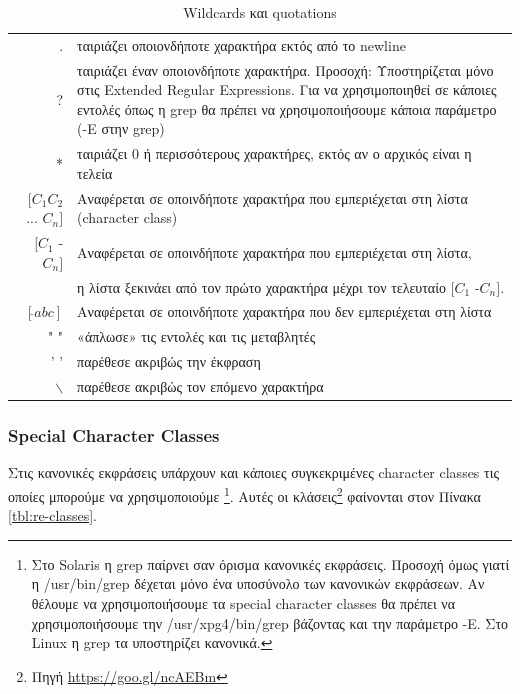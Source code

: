 \begin{table}[h]
	\begin{tabularx}{\columnwidth}{r|X}
		.   & ταιριάζει οποιονδήποτε χαρακτήρα εκτός από το newline \\
		? 	& ταιριάζει έναν οποιονδήποτε χαρακτήρα. Προσοχή: Υποστηρίζεται μόνο στις Extended Regular Expressions. Για να χρησιμοποιηθεί σε κάποιες εντολές όπως η grep θα πρέπει να χρησιμοποιήσουμε κάποια παράμετρο (-E στην grep)\\
		* 	& ταιριάζει 0 ή περισσότερους χαρακτήρες, εκτός αν ο αρχικός είναι η τελεία\\
		$[C_{1}C_{2}$ ... $C_{n}]$ 	& Αναφέρεται σε οποινδήποτε χαρακτήρα που εμπεριέχεται στη λίστα (character class) \\			
		$[C_{1}$ - $C_{n}]$ 		& Αναφέρεται σε οποινδήποτε χαρακτήρα που εμπεριέχεται στη λίστα, \\
		& η λίστα ξεκινάει από τον πρώτο χαρακτήρα μέχρι τον τελευταίο $[C_{1}$ -$C_{n}]$.\\
		$[  \hat{ }abc]$ & Αναφέρεται σε οποινδήποτε χαρακτήρα που δεν εμπεριέχεται στη λίστα\\
		" " & «άπλωσε» τις εντολές και τις μεταβλητές \\
		' ' & παρέθεσε ακριβώς την έκφραση \\
		$\backslash$ & παρέθεσε ακριβώς τον επόμενο χαρακτήρα \\
	\end{tabularx}  
	
	\caption{Wildcards και quotations}
	\label{wildcards}
\end{table}


\subsubsection{Special Character Classes}
Στις κανονικές εκφράσεις υπάρχουν και κάποιες συγκεκριμένες character classes τις οποίες μπορούμε να χρησιμοποιούμε \footnote{Στο Solaris η grep παίρνει σαν όρισμα κανονικές εκφράσεις. Προσοχή όμως γιατί η /usr/bin/grep δέχεται μόνο ένα υποσύνολο των κανονικών εκφράσεων. Αν θέλουμε να χρησιμοποιήσουμε τα special character classes θα πρέπει να χρησιμοποιήσουμε την /usr/xpg4/bin/grep βάζοντας και την παράμετρο -E. Στο Linux η grep τα υποστηρίζει κανονικά.}. Αυτές οι κλάσεις\footnote{Πηγή \href{http://www.petefreitag.com/cheatsheets/regex/character-classes/}{https://goo.gl/ncAEBm}}  φαίνονται στον Πίνακα \ref{tbl:re-classes}. 


